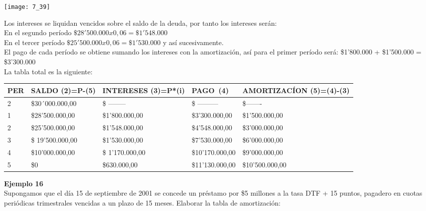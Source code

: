 \begin{center}
	\texttt{[image: 7\_39]}
\end{center}
Los intereses se liquidan vencidos sobre el saldo de la deuda, por tanto los intereses serán:\\

En el segundo período $\$28'500.000 x 0,06 = \$1'548. 000$\\
En el tercer período $\$25'500.000 x 0,06= \$1'530.000$ y así sucesivamente.\\

El pago de cada período se obtiene sumando los intereses con la amortización, así para el primer período será: \$1'800.000 + \$1'500.000 = \$3'300.000\\

La tabla total es la siguiente:

\begin{spacing}{1.1}
    \begin{center}
        \begin{tabular}{|p{1.5cm}|p{2.5cm}|p{2.3cm}|p{2cm}|p{3.5cm}|}
        \hline 
        \rowcolor{white!50}
            \textbf{PER} & \textbf{SALDO (2)=P-(5)} & \textbf{INTERESES  (3)=P*(i)}& \textbf{PAGO\ (4)}& \textbf{AMORTIZACÍON  (5)=(4)-(3)} \\ \hline                        

           
            2 & \$30´000.000,00  &\$ -------- & \$ ---------  & \$-------  \\ \hline
            1 & \$28'500.000,00  &\$1'800.000,00 & \$3'300.000,00  & \$1'500.000,00\\ \hline
            2 & \$25'500.000,00  &\$1'548.000,00  & \$4'548.000,00  & \$3'000.000,00\\ \hline
           3 & \$ 19'500.000,00 &\$1'530.000,00 & \$7'530.000,00  & \$6'000.000,00 \\ \hline
           4 & \$10'000.000,00  &\$ 1'170.000,00& \$10'170.000,00  & \$9'000.000,00 \\ \hline
            5 & \$0  &\$630.000,00 & \$11'130.000,00   & \$10'500.000,00 \\ \hline
\end{tabular}
\end{center}
\end{spacing}

\textbf{Ejemplo 16}\\
Supongamos que el día 15 de septiembre de 2001 se concede un préstamo por \$5 millones a la tasa DTF + 15 puntos, pagadero en cuotas periódicas trimestrales vencidas a un plazo de 15 meses. Elaborar la tabla de amortización:\\

